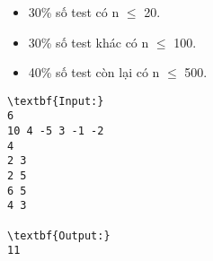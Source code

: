 \begin{itemize}
	\item 30\% số test có n  $\le$  20.
	\item 30\% số test khác có n  $\le$  100.
	\item 40\% số test còn lại có n  $\le$  500.
\end{itemize}
\begin{verbatim}
\textbf{Input:}
6
10 4 -5 3 -1 -2
4
2 3
2 5
6 5
4 3

\textbf{Output:}
11
\end{verbatim}